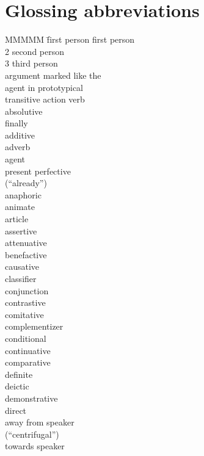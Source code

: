 \section*{Glossing abbreviations}
\begin{multicols}{2}
\begin{tabbing}
MMMMM \= first person \> first person\\
2 \> second person\\
3 \> third person\\
  \> argument marked like the \\
		\> agent in prototypical \\
		\> transitive action verb\\ 
 \> absolutive\\
 \> finally\\ 
 \> additive\\ 
 \> adverb\\ 
 \> agent\\ 
 \> present perfective \\
		 \> (“already”)\\ 
 \> anaphoric\\ 
 \> animate\\ 
 \> article\\ 
 \> assertive\\ 
 \> attenuative\\ 
 \> benefactive\\ 
 \> causative\\ 
 \> classifier\\ 
 \> conjunction\\ 
 \> contrastive\\ 
 \> comitative\\ 
 \> complementizer\\ 
 \> conditional\\ 
 \> continuative\\ 
 \> comparative\\ 
 \> definite\\ 
 \> deictic\\ 
 \> demonstrative\\ 
 \> direct\\ 
 \> away from speaker\\
			\>  (``centrifugal”)\\ 
 \> towards speaker\\

\end{tabbing}
\end{multicols}
